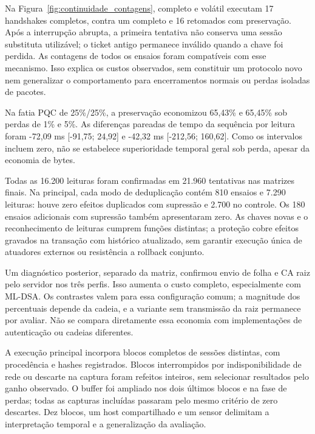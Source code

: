 Na Figura~\ref{fig:continuidade_contagens}, completo e volátil executam 17 handshakes completos, contra um completo e 16 retomados com preservação. Após a interrupção abrupta, a primeira tentativa não conserva uma sessão substituta utilizável; o ticket antigo permanece inválido quando a chave foi perdida. As contagens de todos os ensaios foram compatíveis com esse mecanismo. Isso explica os custos observados, sem constituir um protocolo novo nem generalizar o comportamento para encerramentos normais ou perdas isoladas de pacotes.

Na fatia PQC de 25\%/25\%, a preservação economizou 65,43\% e 65,45\% sob perdas de 1\% e 5\%. As diferenças pareadas de tempo da sequência por leitura foram -72,09 ms [-91,75; 24,92] e -42,32 ms [-212,56; 160,62]. Como os intervalos incluem zero, não se estabelece superioridade temporal geral sob perda, apesar da economia de bytes.

Todas as 16.200 leituras foram confirmadas em 21.960 tentativas nas matrizes finais. Na principal, cada modo de deduplicação contém 810 ensaios e 7.290 leituras: houve zero efeitos duplicados com supressão e 2.700 no controle. Os 180 ensaios adicionais com supressão também apresentaram zero. As chaves novas e o reconhecimento de leituras cumprem funções distintas; a proteção cobre efeitos gravados na transação com histórico atualizado, sem garantir execução única de atuadores externos ou resistência a rollback conjunto.

Um diagnóstico posterior, separado da matriz, confirmou envio de folha e CA raiz pelo servidor nos três perfis. Isso aumenta o custo completo, especialmente com ML-DSA. Os contrastes valem para essa configuração comum; a magnitude dos percentuais depende da cadeia, e a variante sem transmissão da raiz permanece por avaliar. Não se compara diretamente essa economia com implementações de autenticação ou cadeias diferentes.

A execução principal incorpora blocos completos de sessões distintas, com procedência e hashes registrados. Blocos interrompidos por indisponibilidade de rede ou descarte na captura foram refeitos inteiros, sem selecionar resultados pelo ganho observado. O buffer foi ampliado nos dois últimos blocos e na fase de perdas; todas as capturas incluídas passaram pelo mesmo critério de zero descartes. Dez blocos, um host compartilhado e um sensor delimitam a interpretação temporal e a generalização da avaliação.

\FloatBarrier
